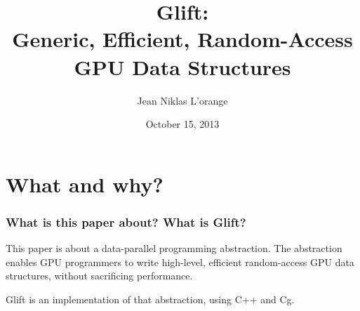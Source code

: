 \documentclass[xcolor={usenames,dvipsnames}]{beamer}
\title[Glift: Generic, Efficient, Random-Access GPU Data Structures]%
      {Glift:\\ Generic, Efficient, Random-Access GPU Data Structures}
\author{Jean Niklas L'orange}
\institute{\texttt{jeannikl@hypirion.com}}
\date{October 15, 2013}
\begin{document}
\begin{frame}
  \titlepage
\end{frame}

\section{What and why?}
\begin{frame}
  \frametitle{What is this paper about? What is Glift?}

  This paper is about a data-parallel programming abstraction. The abstraction
  enables GPU programmers to write high-level, efficient random-access GPU data
  structures, without sacrificing performance.

  \vfill \pause

  Glift is an implementation of that abstraction, using C++ and Cg.
\end{frame}
\end{document}
